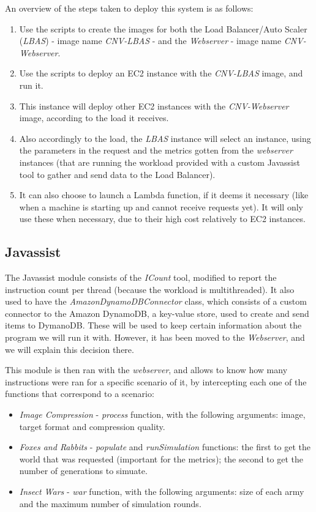\documentclass{article}
\begin{document}
An overview of the steps taken to deploy this system is as follows:

\begin{enumerate}
    \item Use the scripts to create the images for both the Load Balancer/Auto
        Scaler (\textit{LBAS}) - image name \textit{CNV-LBAS} - and the
        \textit{Webserver} - image name \textit{CNV-Webserver}.
    \item Use the scripts to deploy an EC2 instance with the \textit{CNV-LBAS}
        image, and run it.
    \item This instance will deploy other EC2 instances with the
        \textit{CNV-Webserver} image, according to the load it receives.
    \item Also accordingly to the load, the \textit{LBAS} instance will select
        an instance, using the parameters in the request and the metrics gotten
        from the \textit{webserver} instances (that are running the workload provided
        with a custom Javassist tool to gather and send data to the Load
        Balancer).
    \item It can also choose to launch a Lambda function, if it deems it
        necessary (like when a machine is starting up and cannot receive
        requests yet). It will only use these when necessary, due to their high
        cost relatively to EC2 instances.
\end{enumerate}

\subsection{Javassist}

The Javassist module consists of the \textit{ICount} tool, modified to report
the instruction count per thread (because the workload is multithreaded). It
also used to have the \textit{AmazonDynamoDBConnector} class, which consists of
a custom connector to the Amazon DynamoDB, a key-value store, used to create and
send items to DymanoDB. These will be used to keep certain information about the
program we will run it with. However, it has been moved to the
\textit{Webserver}, and we will explain this decision there.

This module is then ran with the \textit{webserver}, and allows to know how many
instructions were ran for a specific scenario of it, by intercepting each one of
the functions that correspond to a scenario:

\begin{itemize}
    \item \textit{Image Compression} - \textit{process} function, with the
        following arguments: image, target format and compression quality.
    \item \textit{Foxes and Rabbits} - \textit{populate} and
        \textit{runSimulation} functions: the first to get the world that was
        requested (important for the metrics); the second to get the number of
        generations to simuate.
    \item \textit{Insect Wars} - \textit{war} function, with the following
        arguments: size of each army and the maximum number of simulation
        rounds.
\end{itemize}
\end{document}
